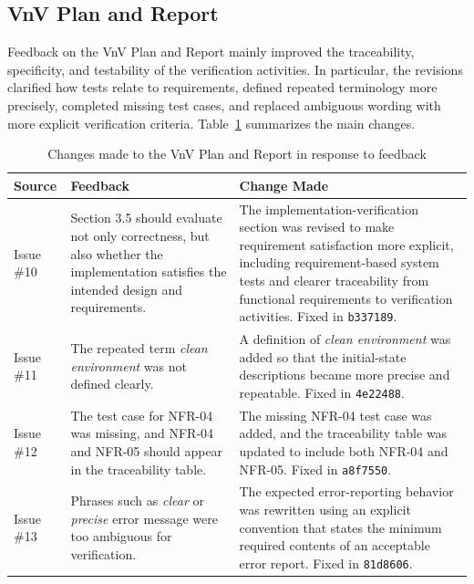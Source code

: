 \documentclass{article}
\begin{document}
\subsection{VnV Plan and Report}

Feedback on the VnV Plan and Report mainly improved the traceability, specificity, and testability of the verification activities.
In particular, the revisions clarified how tests relate to requirements, defined repeated terminology more precisely, completed missing test cases, and replaced ambiguous wording with more explicit verification criteria.
Table~\ref{tab:vnv-feedback} summarizes the main changes.

\begin{table}[H]
\centering
\footnotesize
\renewcommand{\arraystretch}{1.05}
\caption{Changes made to the VnV Plan and Report in response to feedback}
\label{tab:vnv-feedback}
\begin{tabularx}{0.96\textwidth}{p{1.8cm} p{4.2cm} X}
\toprule
\textbf{Source} & \textbf{Feedback} & \textbf{Change Made} \\
\midrule

Issue \#10 &
Section 3.5 should evaluate not only correctness, but also whether the implementation satisfies the intended design and requirements. &
The implementation-verification section was revised to make requirement satisfaction more explicit, including requirement-based system tests and clearer traceability from functional requirements to verification activities. Fixed in \texttt{b337189}. \\

Issue \#11 &
The repeated term \emph{clean environment} was not defined clearly. &
A definition of \emph{clean environment} was added so that the initial-state descriptions became more precise and repeatable. Fixed in \texttt{4e22488}. \\

Issue \#12 &
The test case for NFR-04 was missing, and NFR-04 and NFR-05 should appear in the traceability table. &
The missing NFR-04 test case was added, and the traceability table was updated to include both NFR-04 and NFR-05. Fixed in \texttt{a8f7550}. \\

Issue \#13 &
Phrases such as \emph{clear} or \emph{precise} error message were too ambiguous for verification. &
The expected error-reporting behavior was rewritten using an explicit convention that states the minimum required contents of an acceptable error report. Fixed in \texttt{81d8606}. \\


\end{tabularx}
\end{table}
\end{document}
